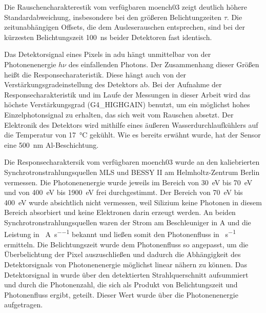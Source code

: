 \noindent
Die Rauschencharakterestik vom verfügbaren \gls{moench03} zeigt deutlich höhere Standardabweichung, insbesondere bei den größeren Belichtungzeiten $\tau$. Die zeitunabhängigen Offsets, die dem Ausleserauschen entsprechen, sind bei der kürzesten Belichtungszeit \SI{100}{\nano\second} beider Detektoren fast identisch.

\noindent
Das Detektorsignal eines Pixels in \gls{adu} hängt unmittelbar von der Photonenenergie $h\nu$ des einfallenden Photons. Der Zusammenhang dieser Größen heißt die Responsecharateristik. Diese hängt auch von der Verstärkungsgradeinstellung des Detektors ab. Bei der Aufnahme der Responsecharakteristik und im Laufe der Messungen in dieser Arbeit wird das höchste Verstärkungsgrad (G4\_HIGHGAIN) benutzt, um ein möglichst hohes Einzelphotonsignal zu erhalten, das sich weit vom Rauschen absetzt. Der Elektronik des Detektors wird mithilfe eines äußeren Wasserdurchlaufkühlers auf die Temperatur von \SI{17}{\celsius} gekühlt. Wie es bereits erwähnt wurde, hat der Sensor eine \SI{500}{\nano\meter} Al-Beschichtung.
%     

\noindent
Die Responsecharaktersik vom verfügbaren \gls{moench03} wurde an den kaliebrierten Synchrotronstrahlungsquellen MLS und BESSY II am Helmholtz-Zentrum Berlin vermessen. Die Photonenenergie wurde jeweils im Bereich von \SI{30}{\eV} bis \SI{70}{\eV} und von \SI{400}{\eV} bis \SI{1900}{\eV} frei durchgestimmt. Der Bereich von \SI{70}{\eV} bis \SI{400}{\eV} wurde absichtlich nicht vermessen, weil Silizium keine Photonen in diesem Bereich absorbiert und keine Elektronen darin erzeugt werden. An beiden Synchrotronstrahlungsquellen waren der Strom am Beschleuniger in \si{\ampere} und die Leistung in \si{\photons\per\ampere\per\second} bekannt und ließen somit den Photonenfluss in \si{\photons\per\second} ermitteln. Die Belichtungszeit wurde dem Photonenfluss so angepasst, um die Überbelichtung der Pixel auszuschließen und dadurch die Abhängigkeit des Detektorsignals von Photonenenergie möglichst linear nähern zu können. Das Detektorsignal in \si{\adu} wurde über den detektierten Strahlquerschnitt aufsummiert und durch die Photonenzahl, die sich als Produkt von Belichtungszeit und Photonenfluss ergibt, geteilt. Dieser Wert wurde über die Photonenenergie aufgetragen.


